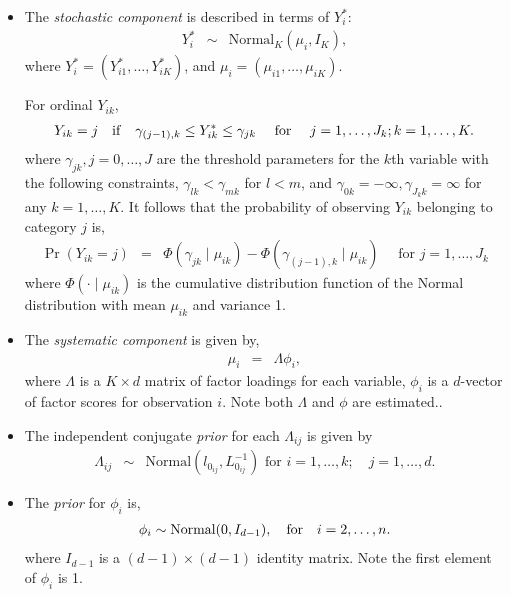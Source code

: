 \begin{itemize}
\item The \emph{stochastic component} is described in terms of $Y_i^*$:
\begin{eqnarray*}
Y_{i}^*  &\sim& \textrm{Normal}_K (\mu_i, I_K),
\end{eqnarray*}
where $Y_i^*=(Y_{i1}^*, \ldots, Y_{iK}^*)$, and $\mu_i=(\mu_{i1},\ldots, \mu_{iK})$.

For ordinal $Y_{ik}$,
\begin{eqnarray*}
Y_{ik} = j \quad {\rm if} \quad \gamma_{(j-1),k} \le Y_{ik}^* \le
\gamma_{jk} \quad \textrm{ for } \quad j=1,\ldots, J_k; k=1,\ldots, K.
\end{eqnarray*}
where $\gamma_{jk}, j=0,\ldots, J$ are the threshold parameters for the $k$th
variable with the following constraints, $\gamma_{lk} < \gamma_{mk}$ for $l < m$, and $\gamma_{0k}=-\infty, \gamma_{J_k k}=\infty$ for any $k=1, \ldots, K$.
It follows that the probability of observing $Y_{ik}$ belonging to category 
$j$ is,
\begin{eqnarray*}
\Pr(Y_{ik}=j) &=&\Phi(\gamma_{jk} \mid \mu_{ik})-\Phi(\gamma_{(j-1),k} \mid \mu_{ik}) \quad 
\textrm{ for } j=1,\ldots,J_k
\end{eqnarray*}
where $\Phi(\cdot\mid\mu_{ik})$ is the cumulative distribution function of the 
Normal distribution with mean $\mu_{ik}$ and variance 1.

\item The \emph{systematic component} is given by,
\begin{eqnarray*}
\mu_i &=& \Lambda\phi_i,
\end{eqnarray*}
where $\Lambda$ is a $K \times d$ matrix of factor loadings for each variable,
$\phi_i$ is a $d$-vector of factor scores for observation $i$. Note both 
$\Lambda$ and $\phi$ are estimated.. 

\item The independent conjugate \emph{prior} for each $\Lambda_{ij}$  is given by
\begin{eqnarray*}
\Lambda_{ij} &\sim& \textrm{Normal}(l_{0_{ij}}, L_{0_{ij}}^{-1}) 
\textrm{ for } i=1,\ldots, k; \quad j=1,\ldots, d.
\end{eqnarray*}

\item The \emph{prior} for $\phi_i$ is,
\begin{eqnarray*}
\phi_{i} \sim \textrm{Normal}(0, I_{d-1}), \quad {\rm for} \quad i=2, \ldots, n.
\end{eqnarray*}
where $I_{d-1}$ is a $ (d-1) \times (d-1) $ identity matrix. Note the
first element of $\phi_i$ is 1. 
\end{itemize}


